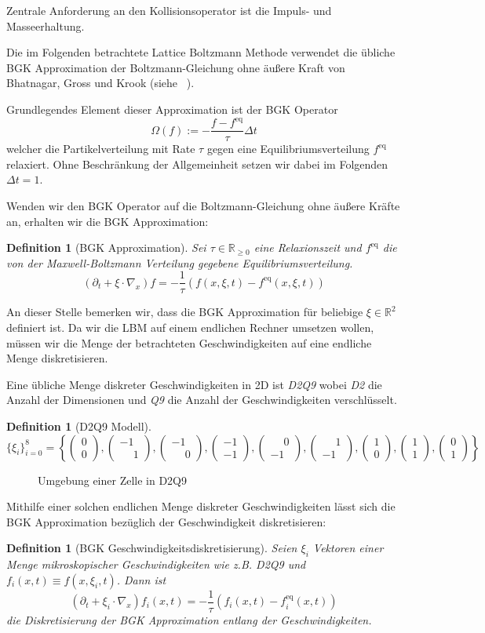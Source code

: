 \documentclass[12pt,a4paper]{scrartcl}
\newtheorem{Definition}[Satz]{Definition}
\numberwithin{equation}{section}
\newcommand{\R}{\mathbb{R}} %
\newcommand{\V}[2]{\ensuremath{\begin{pmatrix}#1\\#2\end{pmatrix}}}
\begin{document}
Zentrale Anforderung an den Kollisionsoperator ist die Impuls- und Masseerhaltung.

Die im Folgenden betrachtete Lattice Boltzmann Methode verwendet die übliche BGK Approximation der Boltzmann-Gleichung ohne äußere Kraft von Bhatnagar, Gross und Krook (siehe ~\cite[Kap.~3.5.3]{krueger17}).

Grundlegendes Element dieser Approximation ist der BGK Operator
\[\Omega(f) := -\frac{f-f^\text{eq}}{\tau} \Delta t\]
welcher die Partikelverteilung mit Rate \(\tau\) gegen eine Equilibriumsverteilung \(f^\text{eq}\) relaxiert. Ohne Beschränkung der Allgemeinheit setzen wir dabei  im Folgenden \(\Delta t = 1\).

Wenden wir den BGK Operator auf die Boltzmann-Gleichung ohne äußere Kräfte an, erhalten wir die BGK Approximation:

\begin{Definition}[BGK Approximation]
Sei \(\tau \in \R_{\geq 0}\) eine Relaxionszeit und \(f^\text{eq}\) die von der Maxwell-Boltzmann Verteilung gegebene Equilibriumsverteilung.
\[ (\partial_t + \xi \cdot \nabla_x) f = -\frac{1}{\tau} (f(x,\xi,t) - f^\text{eq}(x,\xi,t)) \]
\end{Definition}

An dieser Stelle bemerken wir, dass die BGK Approximation für beliebige \(\xi \in \R^2\) definiert ist. Da wir die LBM auf einem endlichen Rechner umsetzen wollen, müssen wir die Menge der betrachteten Geschwindigkeiten auf eine endliche Menge diskretisieren.

Eine übliche Menge diskreter Geschwindigkeiten in 2D ist \emph{D2Q9} wobei \emph{D2} die Anzahl der Dimensionen und \emph{Q9} die Anzahl der Geschwindigkeiten verschlüsselt.

\begin{Definition}[D2Q9 Modell]
\[ \{\xi_i\}_{i=0}^8 = \left\{ \V{0}{0}, \V{-1}{\phantom{-}1}, \V{-1}{\phantom{-}0}, \V{-1}{-1}, \V{\phantom{-}0}{-1}, \V{\phantom{-}1}{-1}, \V{1}{0}, \V{1}{1}, \V{0}{1} \right\} \]
\end{Definition}

\begin{figure}[t]
\centering

\caption{Umgebung einer Zelle in D2Q9}
\end{figure}

Mithilfe einer solchen endlichen Menge diskreter Geschwindigkeiten lässt sich die BGK Approximation bezüglich der Geschwindigkeit diskretisieren:

\begin{Definition}[BGK Geschwindigkeitsdiskretisierung]
\label{def:disVelBGK}
Seien \(\xi_i\) Vektoren einer Menge mikroskopischer Geschwindigkeiten wie z.B. D2Q9 und \(f_i(x,t) \equiv f(x,\xi_i,t)\). Dann ist
\[ (\partial_t + \xi_i \cdot \nabla_x) f_i(x,t) = -\frac{1}{\tau} (f_i(x,t) - f_i^\text{eq}(x,t)) \]
die Diskretisierung der BGK Approximation entlang der Geschwindigkeiten.
\end{Definition}
\end{document}
